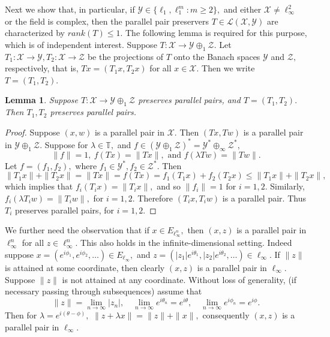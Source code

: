 \documentclass{amsart}
\newtheorem{lemma}[theorem]{Lemma}
\theoremstyle{definition}
\theoremstyle{remark}
\numberwithin{equation}{section}
\begin{document}
Next we show that, in particular,  if $\mathcal{Y}\in\{\ell_1,\ell_1^m:m\geq 2\},$ and either $\mathcal{X}\neq \ell_\infty^2$ or the field is complex, then the parallel pair preservers $ T\in\mathcal{L}(\mathcal{X},\mathcal{Y})$ are characterized by $rank(T)\leq 1.$ 
The following lemma is required for this purpose, which is of independent interest. 
Suppose $T:\mathcal{X}\to \mathcal{Y}\oplus_1 \mathcal{Z}.$ Let   $T_1:\mathcal{X}\to \mathcal{Y}, T_2:\mathcal{X}\to \mathcal{Z}$ be  the projections of $T$ onto the Banach spaces $\mathcal{Y}$ and $\mathcal{Z},$ respectively, that is,  $Tx=(T_1x,T_2x)$ for all $x\in \mathcal{X}.$ Then we write $T=(T_1,T_2).$
\begin{lemma}\label{lem-ngen}
	Suppose $T:\mathcal{X}\to \mathcal{Y}\oplus_1 \mathcal{Z}$ preserves parallel pairs, and $T=(T_1,T_2).$ Then $T_1,T_2$ preserves parallel pairs.
\end{lemma}
\begin{proof}
	Suppose $(x,w)$ is a parallel pair in $\mathcal{X}.$ Then $(Tx,Tw)$ is a parallel pair in $\mathcal{Y}\oplus_1 \mathcal{Z}.$ Suppose for $\lambda\in \mathbb{T},$ and $f\in (\mathcal{Y}\oplus_1 \mathcal{Z})^*=\mathcal{Y}^*\oplus_\infty \mathcal{Z}^*,$ 
	\[\|f\|=1,~f(Tx)=\|Tx\|, \text{ and } f(\lambda Tw)=\|Tw\|.\]	Let $f=(f_1,f_2),$ where $f_1\in \mathcal{Y}^*, f_2\in \mathcal{Z}^*.$ Then
	\[\|T_1x\|+\|T_2x\|=\|Tx\|=f(Tx)=f_1(T_1x)+f_2(T_2x)\leq \|T_1x\|+\|T_2x\|,	\]
	which implies that $f_i(T_ix)=\|T_ix\|,$ and so $\|f_i\|=1$ for $i=1,2.$ Similarly, $f_i(\lambda T_iw)=\|T_iw\|,$ for $i=1,2.$ Therefore $(T_ix,T_iw)$ is a parallel pair. Thus $T_i$ preserves parallel pairs, for $i=1,2.$
\end{proof}
We further need the  observation that if $x\in E_{\ell_\infty^n},$ then $(x,z)$ is a parallel pair in $\ell_\infty^n$ for all $z\in \ell_\infty^n.$ This also holds in the infinite-dimensional setting. Indeed suppose $x=(e^{i\phi_1},e^{i\phi_2},\ldots)\in E_{\ell_\infty},$ and  $z=(|z_1|e^{i\theta_1},|z_2|e^{i\theta_2},\ldots)\in \ell_\infty.$ If $\|z\|$ is attained at some coordinate, then clearly $(x,z)$ is a parallel pair in $\ell_\infty.$ Suppose $\|z\|$ is not attained at any coordinate. Without loss of generality, (if necessary passing through subsequences) assume that $$\|z\|=\lim_{n\to \infty}|z_n|, \quad\lim_{n\to\infty} e^{i\theta_n}=e^{i\theta}, \quad\lim_{n\to\infty} e^{i\phi_n}=e^{i\phi}.$$ Then for $\lambda=e^{i(\theta-\phi)},$ $\|z+\lambda x\|=\|z\|+\|x\|,$ consequently $(x,z)$ is a parallel pair in $\ell_\infty.$
\end{document}
